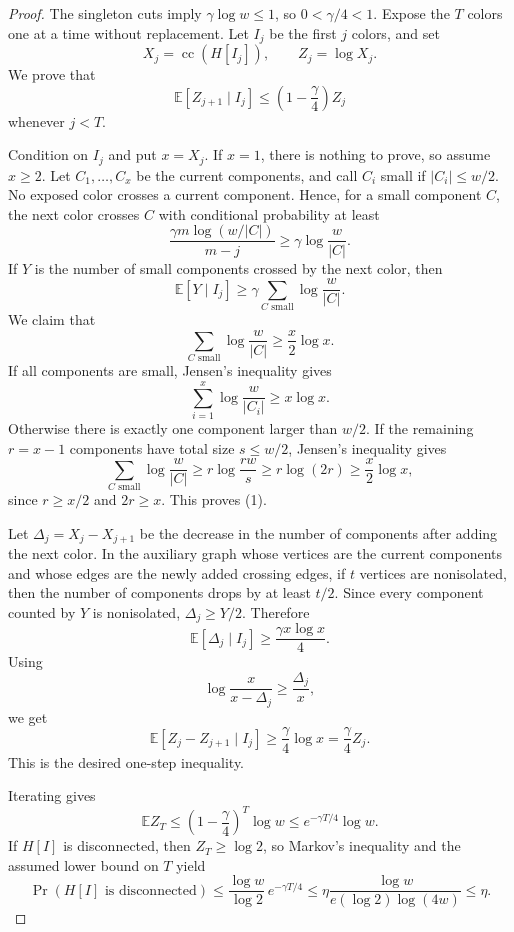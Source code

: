 \documentclass[10pt,a4paper]{amsart}
\DeclareMathOperator{\cc}{cc}
\begin{document}
\begin{proof}
The singleton cuts imply \(\gamma\log w\le1\), so \(0<\gamma/4<1\). Expose the \(T\) colors one at a time without replacement. Let \(I_j\) be the first \(j\) colors, and set
\[
X_j=\cc(H[I_j]),\qquad Z_j=\log X_j.
\]
We prove that
\[
\mathbb E[Z_{j+1}\mid I_j]\le \left(1-\frac\gamma4\right)Z_j
\]
whenever \(j<T\).

Condition on \(I_j\) and put \(x=X_j\). If \(x=1\), there is nothing to prove, so assume \(x\ge2\). Let \(C_1,\ldots,C_x\) be the current components, and call \(C_i\) small if \(|C_i|\le w/2\). No exposed color crosses a current component. Hence, for a small component \(C\), the next color crosses \(C\) with conditional probability at least
\[
\frac{\gamma m\log(w/|C|)}{m-j}\ge \gamma\log\frac{w}{|C|}.
\]
If \(Y\) is the number of small components crossed by the next color, then
\[
\mathbb E[Y\mid I_j]\ge \gamma\sum_{C\text{ small}}\log\frac{w}{|C|}.
\]
We claim that
\[
\sum_{C\text{ small}}\log\frac{w}{|C|}\ge \frac{x}{2}\log x. \tag{1}
\]
If all components are small, Jensen's inequality gives
\[
\sum_{i=1}^x\log\frac{w}{|C_i|}\ge x\log x.
\]
Otherwise there is exactly one component larger than \(w/2\). If the remaining \(r=x-1\) components have total size \(s\le w/2\), Jensen's inequality gives
\[
\sum_{C\text{ small}}\log\frac{w}{|C|}
\ge r\log\frac{rw}{s}
\ge r\log(2r)
\ge \frac{x}{2}\log x,
\]
since \(r\ge x/2\) and \(2r\ge x\). This proves (1).

Let \(\Delta_j=X_j-X_{j+1}\) be the decrease in the number of components after adding the next color. In the auxiliary graph whose vertices are the current components and whose edges are the newly added crossing edges, if \(t\) vertices are nonisolated, then the number of components drops by at least \(t/2\). Since every component counted by \(Y\) is nonisolated, \(\Delta_j\ge Y/2\). Therefore
\[
\mathbb E[\Delta_j\mid I_j]
\ge \frac{\gamma x\log x}{4}.
\]
Using
\[
\log\frac{x}{x-\Delta_j}\ge \frac{\Delta_j}{x},
\]
we get
\[
\mathbb E[Z_j-Z_{j+1}\mid I_j]
\ge \frac{\gamma}{4}\log x
=\frac\gamma4 Z_j.
\]
This is the desired one-step inequality.

Iterating gives
\[
\mathbb E Z_T
\le \left(1-\frac\gamma4\right)^T\log w
\le e^{-\gamma T/4}\log w.
\]
If \(H[I]\) is disconnected, then \(Z_T\ge\log2\), so Markov's inequality and the assumed lower bound on \(T\) yield
\[
\Pr(H[I]\text{ is disconnected})
\le \frac{\log w}{\log2}\,e^{-\gamma T/4}
\le \eta\frac{\log w}{e(\log2)\log(4w)}
\le \eta.
\]
\end{proof}
\end{document}
